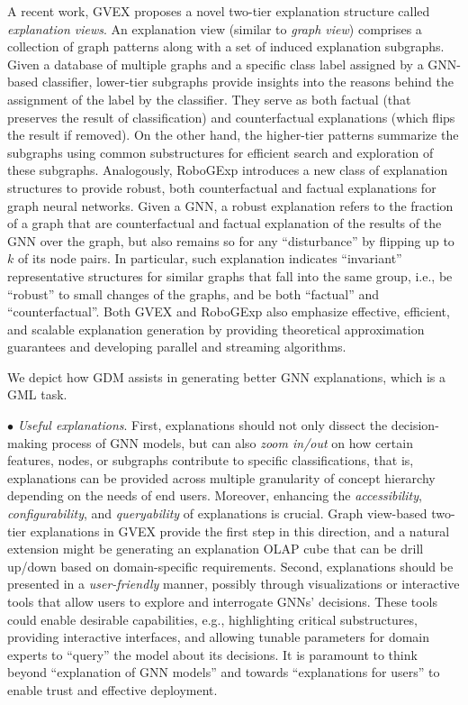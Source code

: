 \documentclass{sig-alternate-10pt}
\newcommand{\spara}[1]{\smallskip\noindent{\bf #1}}
\begin{document}
A recent work, GVEX \cite{ChenQWKKG24} proposes a novel two-tier explanation
structure called {\em explanation views}. An explanation view (similar to {\em graph view}) comprises a collection of graph patterns along with a set of induced explanation subgraphs.
Given a database of multiple graphs and a specific class label assigned by a GNN-based classifier, lower-tier
subgraphs provide insights into the reasons behind the assignment of the label by the classifier. They
serve as both factual (that preserves the result of classification) and counterfactual explanations
(which flips the result if removed). On the other hand, the higher-tier patterns summarize the subgraphs
using common substructures for efficient search and exploration
of these subgraphs. Analogously, RoboGExp \cite{QWKW24} introduces a new class of explanation structures to provide robust, both counterfactual and factual explanations for graph neural networks. Given a GNN, a robust explanation refers to the fraction of
a graph that are counterfactual and factual explanation of the results of the GNN over the graph, but also remains so for any ``disturbance'' by flipping up to $k$ of its node pairs.
In particular, such explanation indicates ``invariant'' representative structures
for similar graphs that fall into the same group, i.e., be ``robust'' to small
changes of the graphs, and be both ``factual'' and
``counterfactual''. Both GVEX and RoboGExp also emphasize effective, efficient, and scalable explanation generation by providing theoretical approximation guarantees and developing parallel and streaming algorithms.

\spara{Synergy.} We depict how GDM assists in generating better GNN explanations, which is a GML task.

\noindent $\bullet$ {\em Useful explanations}. First, explanations should not only dissect the decision-making process of GNN models, but can also {\em zoom in/out} on how certain features, nodes, or subgraphs contribute to specific classifications, that is, explanations can be provided across multiple granularity of concept hierarchy depending on the needs of end users. Moreover, enhancing the {\em accessibility}, {\em configurability}, and {\em queryability} of explanations
is crucial. Graph view-based two-tier explanations in GVEX \cite{ChenQWKKG24} provide the first step in this direction, and a natural extension might be generating an explanation OLAP cube that can be drill up/down based on domain-specific requirements.
Second, explanations should be presented in a {\em user-friendly} manner, possibly through
visualizations or interactive tools that allow users to explore and interrogate GNNs' decisions. These tools could enable desirable capabilities, e.g., highlighting critical substructures, providing interactive interfaces, and allowing tunable parameters for domain experts to ``query'' the model about its decisions. It is paramount to think beyond ``explanation of GNN models'' and towards ``explanations for users'' to enable trust and effective deployment.
\end{document}

